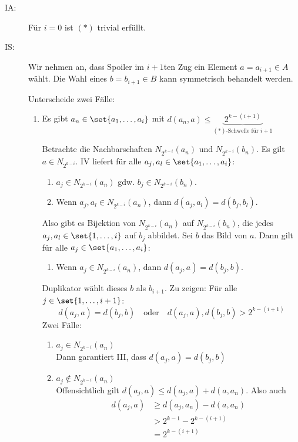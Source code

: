 \begin{description}
  \item[IA:] Für $i=0$ ist $(*)$ trivial erfüllt.
  \item[IS:] Wir nehmen an, dass Spoiler im $i+1$ten Zug ein Element
  $a=a_{i+1}\in A$ wählt. Die Wahl eines $b=b_{i+1}\in B$ kann
  symmetrisch behandelt werden.
  
  Unterscheide zwei Fälle:
  \begin{enumerate}
    \item Es gibt $a_n\in\set{a_1,\dots,a_i}$ mit
    $d(a_n,a)\leq \underbrace{~2^{k-(i+1)}~}_{\text{$(*)$-Schwelle für $i+1$}}$
    
    Betrachte die Nachbarschaften $N_{2^{k-i}}(a_n)$ und $N_{2^{k-i}}(b_n)$.
    Es gilt $a\in N_{2^{k-i}}$. IV liefert für alle $a_j,a_l\in\set{a_1,\dots,a_i}$:
    
    \begin{enumerate}[label=(\Roman*)]
      \item $a_j\in N_{2^{k-i}}(a_n)$ gdw. $b_j\in N_{2^{k-i}}(b_n)$.
      \item Wenn $a_j,a_l\in N_{2^{k-i}}(a_n)$, dann $d(a_j,a_l)=d(b_j,b_l)$.
    \end{enumerate}
    
    Also gibt es Bijektion von $N_{2^{k-i}}(a_n)$ auf $N_{2^{k-i}}(b_n)$, die
    jedes $a_j,a_l\in\set{1,\dots,i}$ auf $b_j$ abbildet. Sei $b$ das Bild von $a$.
    Dann gilt für alle $a_j\in\set{a_1,\dots,a_i}$:

    \begin{enumerate}[label=(\Roman*),resume]
      \item Wenn $a_j\in N_{2^{k-i}}(a_n)$, dann $d(a_j,a)=d(b_j,b)$.
    \end{enumerate}
    
    Duplikator wählt dieses $b$ als $b_{i+1}$. Zu zeigen: Für alle $j\in\set{1,\dots,i+1}$:
    \[
      d(a_j,a)=d(b_j,b) \quad\text{oder}\quad d(a_j,a), d(b_j,b) > 2^{k-(i+1)}
    \]
    Zwei Fälle:
    \begin{enumerate}[label=(\alph*)]
      \item $a_j \in N_{2^{k-i}}(a_n)$\\
      Dann garantiert III, dass $d(a_j,a)=d(b_j,b)$
      
      \item $a_j \not\in N_{2^{k-i}}(a_n)$\\
      Offensichtlich gilt $d(a_j,a) \leq d(a_j,a)+d(a,a_n)$. Also auch
      \begin{align*}
        d(a_j,a) &\geq d(a_j,a_n) - d(a,a_n)\\
                 &> 2^{k-1} - 2^{k-(i+1)}\\
                 &= 2^{k-(i+1)}
      \end{align*}
    \end{enumerate}
    

\end{enumerate}
\end{description}
